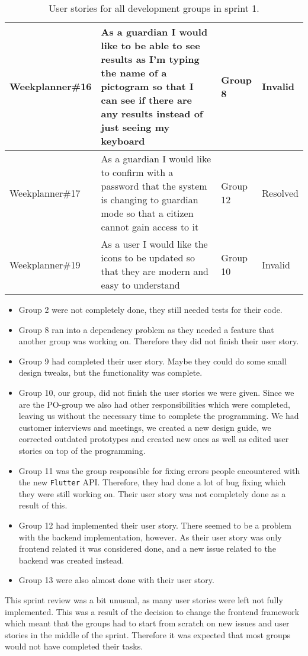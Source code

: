 \begin{table}[H]
\begin{tabular}{|p{2.8cm}|p{7cm}|p{2cm}|p{1.5cm}|}
    Weekplanner\#16 & As a guardian I would like to be able to see results as I'm typing the name of a pictogram so that I can see if there are any results instead of just seeing my keyboard & Group 8         & Invalid    \\ \hline
    Weekplanner\#17 & As a guardian I would like to confirm with a password that the system is changing to guardian mode so that a citizen cannot gain access to it                            & Group 12        & Resolved   \\ \hline
    Weekplanner\#19 & As a user I would like the icons to be updated so that they are modern and easy to understand                                                                            & Group 10        & Invalid    \\ \hline
    \end{tabular}
    \caption{User stories for all development groups in sprint 1.}\label{table:user-stories-sprint-1-review}
\end{table}

\begin{itemize}
    \item Group 2 were not completely done, they still needed tests for their code.
    \item Group 8 ran into a dependency problem as they needed a feature that another group was working on. Therefore they did not finish their user story.
    \item Group 9 had completed their user story. Maybe they could do some small design tweaks, but the functionality was complete.
    \item Group 10, our group, did not finish the user stories we were given. Since we are the PO-group we also had other responsibilities which were completed, leaving us without the necessary time to complete the programming. We had customer interviews and meetings, we created a new design guide, we corrected outdated prototypes and created new ones as well as edited user stories on top of the programming.
    \item Group 11 was the group responsible for fixing errors people encountered with the new \texttt{Flutter} API. Therefore, they had done a lot of bug fixing which they were still working on. Their user story was not completely done as a result of this.
    \item Group 12 had implemented their user story. There seemed to be a problem with the backend implementation, however. As their user story was only frontend related it was considered done, and a new issue related to the backend was created instead.
    \item Group 13 were also almost done with their user story.
\end{itemize}
\noindent
This sprint review was a bit unusual, as many user stories were left not fully implemented. This was a result of the decision to change the frontend framework which meant that the groups had to start from scratch on new issues and user stories in the middle of the sprint.
Therefore it was expected that most groups would not have completed their tasks.


